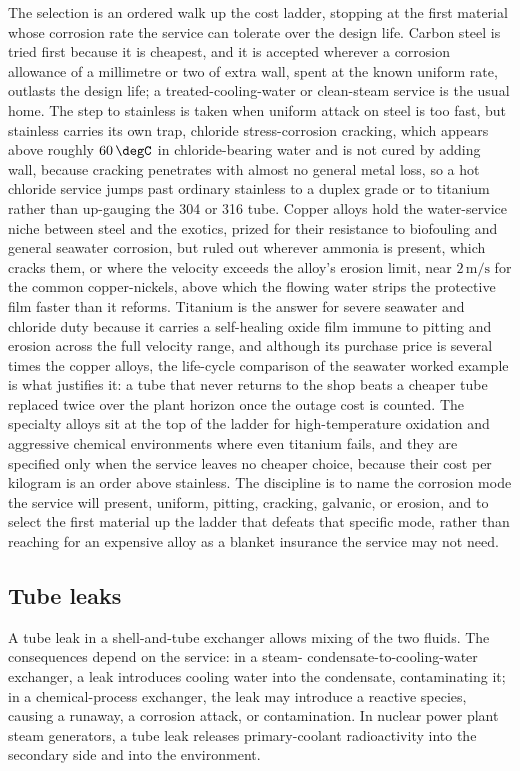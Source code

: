 The selection is an ordered walk up the cost ladder, stopping at the first material
whose corrosion rate the service can tolerate over the design life. Carbon steel is
tried first because it is cheapest, and it is accepted wherever a corrosion allowance
of a millimetre or two of extra wall, spent at the known uniform rate, outlasts the
design life; a treated-cooling-water or clean-steam service is the usual home. The
step to stainless is taken when uniform attack on steel is too fast, but stainless
carries its own trap, chloride stress-corrosion cracking, which appears above roughly
$60\,\degC$ in chloride-bearing water and is not cured by adding wall, because
cracking penetrates with almost no general metal loss, so a hot chloride service jumps
past ordinary stainless to a duplex grade or to titanium rather than up-gauging the
304 or 316 tube. Copper alloys hold the water-service niche between steel and the
exotics, prized for their resistance to biofouling and general seawater corrosion, but
ruled out wherever ammonia is present, which cracks them, or where the velocity
exceeds the alloy's erosion limit, near $2\,\text{m/s}$ for the common
copper-nickels, above which the flowing water strips the protective film faster than
it reforms. Titanium is the answer for severe seawater and chloride duty because it
carries a self-healing oxide film immune to pitting and erosion across the full
velocity range, and although its purchase price is several times the copper alloys,
the life-cycle comparison of the seawater worked example is what justifies it: a tube
that never returns to the shop beats a cheaper tube replaced twice over the plant
horizon once the outage cost is counted. The specialty alloys sit at the top of the
ladder for high-temperature oxidation and aggressive chemical environments where even
titanium fails, and they are specified only when the service leaves no cheaper choice,
because their cost per kilogram is an order above stainless. The discipline is to name
the corrosion mode the service will present, uniform, pitting, cracking, galvanic, or
erosion, and to select the first material up the ladder that defeats that specific
mode, rather than reaching for an expensive alloy as a blanket insurance the service
may not need.

\subsection{Tube leaks}

A tube leak in a shell-and-tube exchanger allows mixing of the two
fluids. The consequences depend on the service: in a steam-
condensate-to-cooling-water exchanger, a leak introduces cooling
water into the condensate, contaminating it; in a chemical-process
exchanger, the leak may introduce a reactive species, causing a
runaway, a corrosion attack, or contamination. In nuclear power
plant steam generators, a tube leak releases primary-coolant
radioactivity into the secondary side and into the environment.

